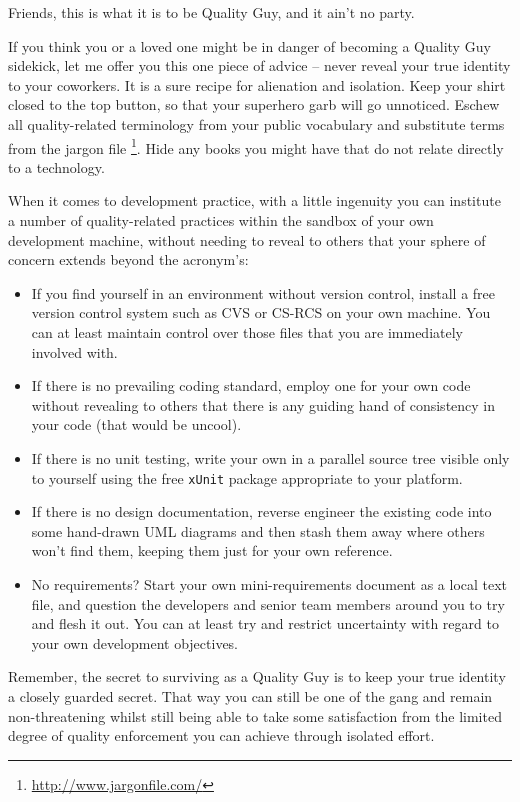 \documentclass{article}
\begin{document}
Friends, this is what it is to be Quality Guy, and it ain't no party.

If you think you or a loved one might be in danger of becoming a Quality
Guy sidekick, let me offer you this one piece of advice -- never reveal
your true identity to your coworkers. It is a sure recipe for alienation
and isolation. Keep your shirt closed to the top button, so that your
superhero garb will go unnoticed. Eschew all quality-related terminology
from your public vocabulary and substitute terms from the jargon file
 \footnote{\url{http://www.jargonfile.com/}}. Hide any books you might have that do not relate directly to a
technology.

When it comes to development practice, with a little ingenuity you can
institute a number of quality-related practices within the sandbox of
your own development machine, without needing to reveal to others that
your sphere of concern extends beyond the acronym's:

\begin{itemize}
\item If you find yourself in an environment without version control,
install a free version control system such as CVS or CS-RCS on your
own machine. You can at least maintain control over those files that
you are immediately involved with.
\item If there is no prevailing coding standard, employ one for your own
code without revealing to others that there is any guiding hand of
consistency in your code (that would be uncool).
\item If there is no unit testing, write your own in a parallel source tree
visible only to yourself using the free \texttt{xUnit} package appropriate
to your platform.
\item If there is no design documentation, reverse engineer the existing
code into some hand-drawn UML diagrams and then stash them away where
others won't find them, keeping them just for your own reference.
\item No requirements? Start your own mini-requirements document as a local
text file, and question the developers and senior team members around
you to try and flesh it out. You can at least try and restrict
uncertainty with regard to your own development objectives.
\end{itemize}

Remember, the secret to surviving as a Quality Guy is to keep your true
identity a closely guarded secret. That way you can still be one of the
gang and remain non-threatening whilst still being able to take some
satisfaction from the limited degree of quality enforcement you can
achieve through isolated effort.
\end{document}
